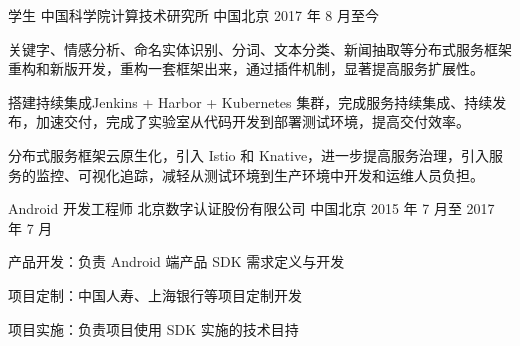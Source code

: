 

\begin{cventries}

  \cventry
    {学生} %
    {中国科学院计算技术研究所} %
    {中国北京} %
    {2017 年 8 月至今} %
    {
      \begin{cvitems} %
        \item 关键字、情感分析、命名实体识别、分词、文本分类、新闻抽取等分布式服务框架重构和新版开发，重构一套框架出来，通过插件机制，显著提高服务扩展性。
        \item 搭建持续集成Jenkins + Harbor + Kubernetes 集群，完成服务持续集成、持续发布，加速交付，完成了实验室从代码开发到部署测试环境，提高交付效率。
        \item 分布式服务框架云原生化，引入 Istio 和 Knative，进一步提高服务治理，引入服务的监控、可视化追踪，减轻从测试环境到生产环境中开发和运维人员负担。
      \end{cvitems}
    }

  \cventry
    {Android 开发工程师} %
    {北京数字认证股份有限公司} %
    {中国北京} %
    {2015 年 7 月至 2017 年 7 月} %
    {
      \begin{cvitems} %
        \item 产品开发：负责 Android 端产品 SDK 需求定义与开发
        \item 项目定制：中国人寿、上海银行等项目定制开发
        \item 项目实施：负责项目使用 SDK 实施的技术目持
      \end{cvitems}
    }

\end{cventries}
